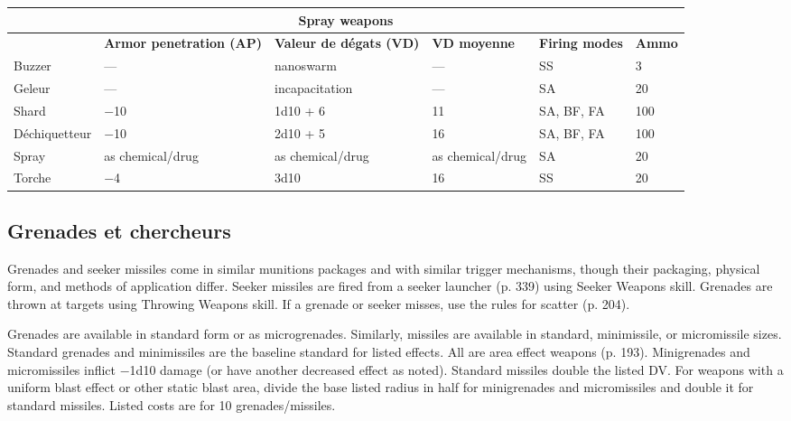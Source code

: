 \begin{table} \begin{tabularx}{\textwidth}{|l|X|l|l|l|l|} \hline

\multicolumn{6}{|c|}{\textbf{Spray weapons}} \\ \hline

&\textbf{Armor penetration (AP)}	&\textbf{Valeur de dégats (VD)}	&\textbf{VD moyenne}	&\textbf{Firing modes}	&\textbf{Ammo} \\ \hline

Buzzer	&--- &nanoswarm	&--- &SS	&3 \\ \hline

Geleur	&--- &incapacitation	&--- &SA	&20 \\ \hline

Shard	&$-$10	&1d10 + 6	&11	&SA, BF, FA	&100 \\ \hline

Déchiquetteur	&$-$10	&2d10 + 5	&16	&SA, BF, FA	&100 \\ \hline

Spray	&as chemical/drug	&as chemical/drug	&as chemical/drug	&SA	&20 \\ \hline

Torche	&$-$4	&3d10	&16	&SS	&20 \\ \hline

\end{tabularx} \label{tab:spray-weapons} \end{table} 

\subsection{Grenades et chercheurs} \label{sec:grenades-seekers} 

Grenades and seeker missiles come in similar munitions packages and with similar trigger mechanisms, though their packaging, physical form, and methods of application differ. Seeker missiles are fired from a seeker launcher (p. 339) using Seeker Weapons skill. Grenades are thrown at targets using Throwing Weapons skill. If a grenade or seeker misses, use the rules for scatter (p. 204). 

Grenades are available in standard form or as microgrenades. Similarly, missiles are available in standard, minimissile, or micromissile sizes. Standard grenades and minimissiles are the baseline standard for listed effects. All are area effect weapons (p. 193). Minigrenades and micromissiles inflict $-$1d10 damage (or have another decreased effect as noted). Standard missiles double the listed DV. For weapons with a uniform blast effect or other static blast area, divide the base listed radius in half for minigrenades and micromissiles and double it for standard missiles. Listed costs are for 10 grenades/missiles. 

